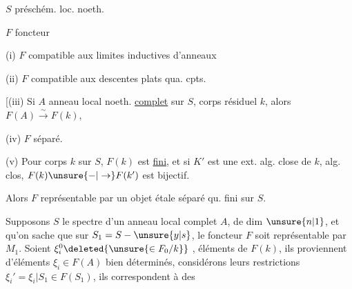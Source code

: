 
$S$ préschém. loc. noeth.

$F$ foncteur

(i) $F$ compatible aux limites inductives d'anneaux

(ii) $F$ compatible aux descentes  plats qua. cpts. 

[(iii) Si $A$ anneau local noeth. \uline{complet} sur $S$, corps résiduel $k$, alors $F(A)\xrightarrow{\sim}F(k)$,

(iv) $F$ séparé.

(v) Pour  corps $k$ sur $S$, $F(k)$ est \uline{fini}, et si $K'$ est une ext. alg. close de $k$,  alg. clos, $F(k)\unsure{-|\to}F(k')$ est bijectif.

Alors $F$ représentable par un  objet étale  séparé qu. fini sur $S$.


Supposons $S$ le spectre d'un anneau local complet $A$,   de dim $\unsure{n|1}$, et qu'on sache que sur $S_1=S-\unsure{y|s}$, le foncteur $F$ soit représentable par $M_1$.  Soient $\xi_i^0\deleted{\unsure{\in F_0/k}}$ , éléments de $F(k)$, ils proviennent d'éléments $\xi_i\in F(A)$ bien déterminés, considérons leurs restrictions $\xi_i'=\xi_i|S_1\in F(S_1)$, ils correspondent à des
